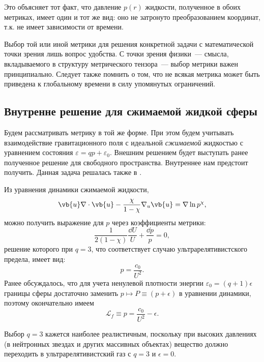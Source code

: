 \documentclass[\docroot/reports/draft/report.tex]{subfiles}
\begin{document}
    Это объясняет тот факт, что давление $p(r)$ жидкости, полученное в обоих метриках, имеет один и тот же вид: оно не затронуто преобразованием координат, т.к. не имеет зависимости от времени.

    Выбор той или иной метрики для решения конкретной задачи с математической точки зрения лишь вопрос удобства. С точки зрения физики~--- смысла, вкладываемого в структуру метрического тензора~--- выбор метрики важен принципиально. Следует также помнить о том, что не всякая метрика может быть приведена к глобальному времени в силу упомянутых ограничений.

\subsection{Внутренне решение для сжимаемой жидкой сферы}

    Будем рассматривать метрику в той же форме. При этом будем учитывать взаимодействие гравитационного поля с идеальной \textit{сжимаемой} жидкостью с уравнением состояния $\varepsilon = q p + \varepsilon_0$. Внешним решением будет выступать ранее полученное решение для свободного пространства. Внутреннее нам предстоит получить. Данная задача решалась также в \cite{burlankov_new_phys}.

    Из уравнения динамики сжимаемой жидкости,
    \begin{equation*}
        \vb{u} \nabla \cdot \vb{u} - \frac{\chi}{1 - \chi} \nabla_u \vb{u} = \nabla \ln p^{\chi} ,
    \end{equation*}
    можно получить выражение для $p$ через коэффициенты метрики:
    \begin{equation*}
        \frac{1}{2 (1 - \chi)} \frac{\dd{U}}{U} + \frac{\dd{p}}{p} = 0 ,
    \end{equation*}
    решение которого при $q = 3$, что соответствует случаю ультрарелятивистского предела, имеет вид:
    \begin{equation*}
        p = \frac{c_0}{U^2} .
    \end{equation*}
    Ранее обсуждалось, что для учета ненулевой плотности энергии $\varepsilon_0 = (q+1) \epsilon$ границы сферы достаточно заменить $p \mapsto P \equiv (p + \epsilon)$ в уравнении динамики, поэтому окончательно имеем
    \begin{equation*}
        \mathcal{L}_f \equiv p = \frac{c_0}{U^2} - \epsilon .
    \end{equation*}

    Выбор $q = 3$ кажется наиболее реалистичным, поскольку при высоких давлениях (в нейтронных звездах и других массивных объектах) вещество должно переходить в ультрарелятивистский газ \cite{oppenheimer_volkoff,burlankov_new_phys} с $q = 3$ и $\epsilon = 0$.
\end{document}
